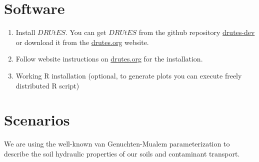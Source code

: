 \documentclass[
10pt, %
a4paper, %
oneside, %
headinclude,footinclude, %
BCOR5mm, %
]{scrartcl}
\begin{document}
\section{Software}

\begin{enumerate}
\item Install $DRUtES$. You can get $DRUtES$ from the github repository \href{https://github.com/michalkuraz/drutes-dev/} {drutes-dev} or download it from the \href{http://drutes.org/public/?core=account}{drutes.org} website. 
\item Follow website instructions on \href{http://drutes.org/public/?core=account}{drutes.org} for the installation.
\item Working R installation (optional, to generate plots you can execute freely distributed R script) 
\end{enumerate}

\newpage
\section{Scenarios}

We are using the well-known van Genuchten-Mualem parameterization to describe the soil hydraulic properties of our soils and contaminant transport. 

\begin{table}[!h]
\centering
\caption{\label{tab_heat}Material properties needed for scenarios.}
\end{table}
\end{document}
